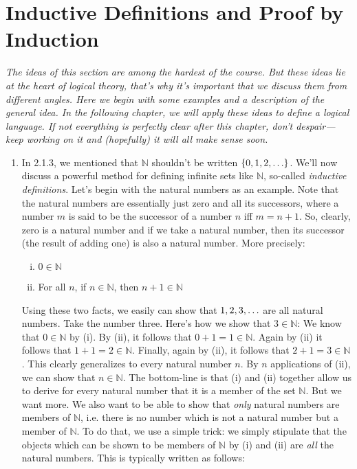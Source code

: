 \section{Inductive Definitions and Proof by Induction}

\emph{The ideas of this section are among the hardest of the course. But these ideas lie at the heart of logical theory, that's why it's important that we discuss them from different angles. Here we begin with some examples and a description of the general idea. In the following chapter, we will apply these ideas to define a logical language. If not everything is perfectly clear after this chapter, don't despair---keep working on it and (hopefully) it will all make sense soon.}

\begin{enumerate}[{\thesection}.1]

	\item In 2.1.3, we mentioned that $\mathbb{N}$ shouldn't be written $\{0,1,2,\mathellipsis\}$. We'll now discuss a powerful method for defining infinite sets like $\mathbb{N}$, so-called \emph{inductive definitions}. Let's begin with the natural numbers as an example. Note that the natural numbers are essentially just zero and all its successors, where a number $m$ is said to be the successor of a number $n$ iff $m=n+1$. So, clearly, zero is a natural number and if we take a natural  number, then its successor (the result of adding one) is also a natural number. More precisely:	
	\begin{enumerate}[(i)]
	
		\item $0\in \mathbb{N}$
		
		\item For all $n$, if $n\in\mathbb{N}$, then $n+1\in \mathbb{N}$
	
	\end{enumerate}
	
	Using these two facts, we easily can show that $1,2,3, \mathellipsis$ are all natural numbers. Take the number three. Here's how we show that $3\in \mathbb{N}$: We know that $0\in\mathbb{N}$ by (i). By (ii), it follows that $0+1=1\in\mathbb{N}$. Again by (ii) it follows that $1+1=2\in\mathbb{N}$. Finally, again by (ii), it follows that $2+1=3\in \mathbb{N}$. This clearly generalizes to every natural number $n$. By $n$ applications of (ii), we can show that $n\in\mathbb{N}$. The bottom-line is that (i) and (ii) together allow us to derive for every natural number that it is a member of the set $\mathbb{N}$. But we want more. We also want to be able to show that \emph{only} natural numbers are members of $\mathbb{N}$, i.e. there is no number which is not a natural number but a member of $\mathbb{N}$.	 To do that, we use a simple trick: we simply stipulate that the objects which can be shown to be members of $\mathbb{N}$ by (i) and (ii) are \emph{all} the natural numbers. This is typically written as follows:
	\begin{enumerate}[(i)]
	

\end{enumerate}
\end{enumerate}
